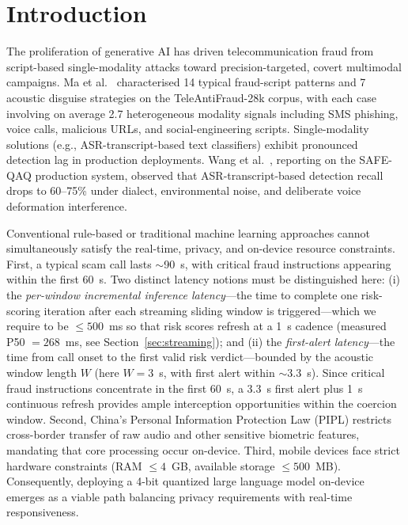 \documentclass[final,5p,times,number]{elsarticle}
\begin{document}
\section{Introduction}
The proliferation of generative AI has driven telecommunication fraud from script-based single-modality attacks toward precision-targeted, covert multimodal campaigns. Ma et al.~\cite{1} characterised 14 typical fraud-script patterns and 7 acoustic disguise strategies on the TeleAntiFraud-28k corpus, with each case involving on average 2.7 heterogeneous modality signals including SMS phishing, voice calls, malicious URLs, and social-engineering scripts. Single-modality solutions (e.g., ASR-transcript-based text classifiers) exhibit pronounced detection lag in production deployments. Wang et al.~\cite{2}, reporting on the SAFE-QAQ production system, observed that ASR-transcript-based detection recall drops to 60--75\% under dialect, environmental noise, and deliberate voice deformation interference.

Conventional rule-based or traditional machine learning approaches cannot simultaneously satisfy the real-time, privacy, and on-device resource constraints. First, a typical scam call lasts $\sim$90~s, with critical fraud instructions appearing within the first 60~s. Two distinct latency notions must be distinguished here: (i) the \emph{per-window incremental inference latency}---the time to complete one risk-scoring iteration after each streaming sliding window is triggered---which we require to be $\le 500$~ms so that risk scores refresh at a 1~s cadence (measured P50 $=268$~ms, see Section~\ref{sec:streaming}); and (ii) the \emph{first-alert latency}---the time from call onset to the first valid risk verdict---bounded by the acoustic window length $W$ (here $W=3$~s, with first alert within $\sim$3.3~s). Since critical fraud instructions concentrate in the first 60~s, a 3.3~s first alert plus 1~s continuous refresh provides ample interception opportunities within the coercion window. Second, China's Personal Information Protection Law (PIPL) restricts cross-border transfer of raw audio and other sensitive biometric features, mandating that core processing occur on-device. Third, mobile devices face strict hardware constraints (RAM $\le 4$~GB, available storage $\le 500$~MB). Consequently, deploying a 4-bit quantized large language model on-device emerges as a viable path balancing privacy requirements with real-time responsiveness.
\end{document}
